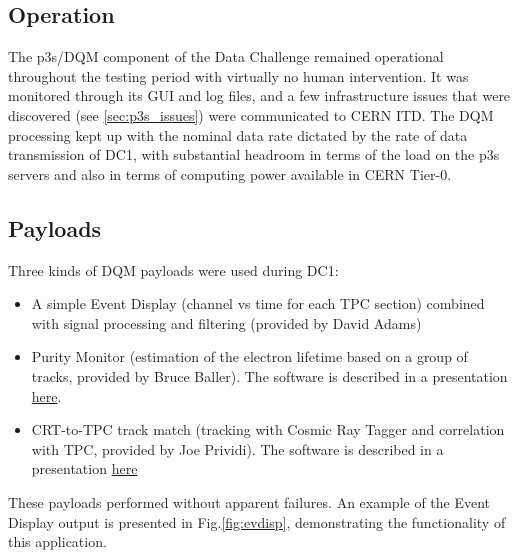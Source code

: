 \documentclass[pdftex,12pt,letter]{article}
\begin{document}
\subsection{Operation}
The p3s/DQM component of the Data Challenge remained operational throughout the testing period with virtually no human intervention.
It was monitored through its GUI and log files, and a few infrastructure issues that were discovered (see \ref{sec:p3s_issues}) were communicated
to CERN ITD. The DQM processing kept up with the nominal data rate dictated by the rate of data transmission of DC1, with substantial headroom in
terms of the load on the p3s servers and also in terms of computing power available in CERN Tier-0.

\subsection{Payloads}
Three kinds of DQM payloads were used during DC1:
\begin{itemize}

\item A simple Event Display (channel vs time for each TPC section) combined with signal processing
and filtering (provided by David Adams)
\item Purity Monitor (estimation of the electron lifetime based on a group of tracks, provided by Bruce Baller). The software is described in a presentation \href{https://indico.fnal.gov/event/14840/contribution/0/material/slides/0.pdf}{here}.

\item CRT-to-TPC track match (tracking with Cosmic Ray Tagger and correlation with TPC,  provided by Joe Prividi). The software is described in a presentation \href{https://indico.fnal.gov/event/13293/session/6/contribution/112/material/slides/0.pdf}{here}

\end{itemize}
\noindent These payloads performed without apparent failures. An example of the Event Display output
is presented in Fig.\ref{fig:evdisp}, demonstrating the functionality of this application.
\end{document}
